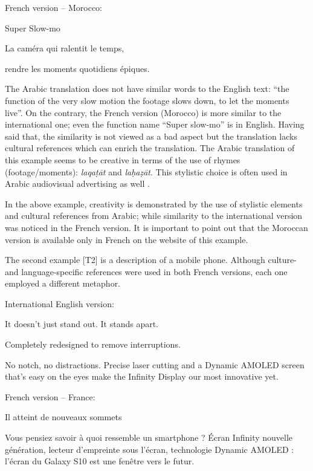 \documentclass[output=paper]{langsci/langscibook}
\begin{document}
French version – Morocco:

\begin{center}
  Super Slow-mo

  La caméra qui ralentit le temps,
  
  rendre les moments quotidiens épiques.
\end{center}

The Arabic translation does not have similar words to the English text: \enquote{the function of the very slow motion {\textbar} the footage slows down, to let the moments live}. On the contrary, the French version (Morocco) is more similar to the international one; even the function name \enquote{Super slow-mo} is in English. Having said that, the similarity is not viewed as a bad aspect but the translation lacks cultural references which can enrich the translation. The Arabic translation of this example seems to be creative in terms of the use of rhymes (footage/moments): \textit{laqaṭāt} and \textit{laḥaẓāt}. This stylistic choice is often used in Arabic audiovisual advertising as well \parencite{gully96}.

In the above example, creativity is demonstrated by the use of stylistic elements and cultural references from Arabic; while similarity to the international version was noticed in the French version. It is important to point out that the Moroccan version is available only in French on the website of this example.

The second example [T2] is a description of a mobile phone. Although culture- and language-specific references were used in both French versions, each one employed a different metaphor. 

International English version:

\begin{center}
  It doesn't just stand out. It stands apart.

  Completely redesigned to remove interruptions.

  No notch, no distractions. Precise laser cutting and a Dynamic AMOLED screen that's easy on the eyes make the Infinity Display our most innovative yet.
\end{center}

French version – France:

\begin{center}
  Il atteint de nouveaux sommets

  Vous pensiez savoir à quoi ressemble un smartphone ? Écran Infinity nouvelle génération, lecteur d'empreinte sous l'écran, technologie Dynamic AMOLED : l'écran du Galaxy S10 est une fenêtre vers le futur.
\end{center}
\end{document}

